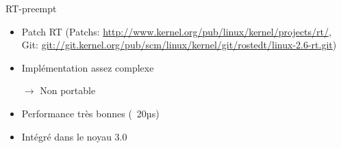 \begin{frame}{RT-preempt}
 \begin{itemize}
 \item                 Patch                RT                (Patchs:
   \url{http://www.kernel.org/pub/linux/kernel/projects/rt/},   Git:
   \url{git://git.kernel.org/pub/scm/linux/kernel/git/rostedt/linux-2.6-rt.git})
  \item Implémentation assez complexe
  \item[$\to$] Non portable
  \item Performance très bonnes (~20µs)
  \item Intégré dans le noyau 3.0
 \end{itemize}
\end{frame}
